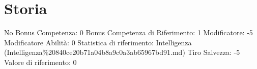 \section{Storia}\label{storia}

\begin{description}
\tightlist
\item[Tags: ABI]
No Bonus Competenza: 0 Bonus Competenza di Riferimento: 1 Modificatore:
-5 Modificatore Abilità: 0 Statistica di riferimento: Intelligenza
(Intelligenza\%20840ce20b71a04b8a9c0a3ab65967bd91.md) Tiro Salvezza: -5
Valore di riferimento: 0
\end{description}
